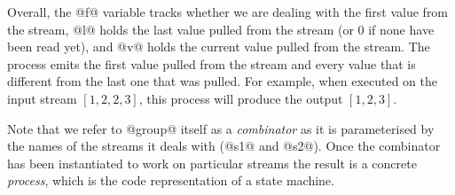 Overall, the @f@ variable tracks whether we are dealing with the first value from the stream, @l@ holds the last value pulled from the stream (or 0 if none have been read yet), and @v@ holds the current value pulled from the stream.
The process emits the first value pulled from the stream and every value that is different from the last one that was pulled.
For example, when executed on the input stream $[1, 2, 2, 3]$, this process will produce the output $[1, 2, 3]$.

Note that we refer to @group@ itself as a \emph{combinator} as it is parameterised by the names of the streams it deals with (@s1@ and @s2@). Once the combinator has been instantiated to work on particular streams the result is a concrete \emph{process}, which is the code representation of a state machine.







